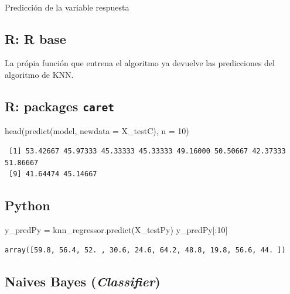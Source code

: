 \documentclass[
  letterpaper,
  DIV=11,
  numbers=noendperiod]{scrartcl}
\makeatletter
\let\oldparagraph\paragraph
\renewcommand{\paragraph}{
    \@ifstar
      \xxxParagraphStar
      \xxxParagraphNoStar
  }
\newcommand{\xxxParagraphStar}[1]{\oldparagraph*{#1}\mbox{}}
\newcommand{\xxxParagraphNoStar}[1]{\oldparagraph{#1}\mbox{}}
\newenvironment{Shaded}{\begin{snugshade}}{\end{snugshade}}
\newcommand{\AttributeTok}[1]{\textcolor[rgb]{0.40,0.45,0.13}{#1}}
\newcommand{\DecValTok}[1]{\textcolor[rgb]{0.68,0.00,0.00}{#1}}
\newcommand{\FunctionTok}[1]{\textcolor[rgb]{0.28,0.35,0.67}{#1}}
\newcommand{\NormalTok}[1]{\textcolor[rgb]{0.00,0.23,0.31}{#1}}
\newcommand{\OperatorTok}[1]{\textcolor[rgb]{0.37,0.37,0.37}{#1}}
\makeatother
\begin{document}
\paragraph{Predicción de la variable
respuesta}\label{predicciuxf3n-de-la-variable-respuesta-1}

\subsection{R: R base}

La própia función que entrena el algoritmo ya devuelve las predicciones
del algoritmo de KNN.

\subsection{\texorpdfstring{R: packages
\texttt{caret}}{R: packages caret}}

\begin{Shaded}
\begin{Highlighting}[]
\FunctionTok{head}\NormalTok{(}\FunctionTok{predict}\NormalTok{(model, }\AttributeTok{newdata =}\NormalTok{ X\_testC), }\AttributeTok{n =} \DecValTok{10}\NormalTok{)}
\end{Highlighting}
\end{Shaded}

\begin{verbatim}
 [1] 53.42667 45.97333 45.33333 45.33333 49.16000 50.50667 42.37333 51.86667
 [9] 41.64474 45.14667
\end{verbatim}

\subsection{Python}

\begin{Shaded}
\begin{Highlighting}[]
\NormalTok{y\_predPy }\OperatorTok{=}\NormalTok{ knn\_regressor.predict(X\_testPy)}
\NormalTok{y\_predPy[:}\DecValTok{10}\NormalTok{]}
\end{Highlighting}
\end{Shaded}

\begin{verbatim}
array([59.8, 56.4, 52. , 30.6, 24.6, 64.2, 48.8, 19.8, 56.6, 44. ])
\end{verbatim}

\subsection{\texorpdfstring{Naives Bayes
(\emph{Classifier})}{Naives Bayes (Classifier)}}\label{naives-bayes-classifier}
\end{document}

